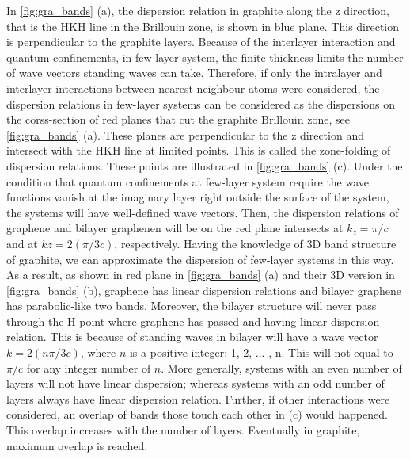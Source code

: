 In \autoref{fig:gra_bands} (a), the dispersion relation in graphite along the z direction, that is the HKH line in the Brillouin zone, is shown in blue plane. This direction is perpendicular to the graphite layers. Because of the interlayer interaction and quantum confinements, in few-layer system, the finite thickness limits the number of wave vectors standing waves can take.  Therefore, if only the intralayer and interlayer interactions between nearest neighbour atoms were considered, the dispersion relations in few-layer systems can be considered as the dispersions on the corss-section of red planes that cut the graphite Brillouin zone, see \autoref{fig:gra_bands} (a).  These planes are perpendicular to the z direction and intersect with the HKH line at limited points. This is called the zone-folding of dispersion relations\cite{saito1998physical}. These points are illustrated in \autoref{fig:gra_bands} (c). Under the condition that quantum confinements at few-layer system require the wave functions vanish at the imaginary layer right outside the surface of the system, the systems will have well-defined wave vectors. Then, the dispersion relations of graphene and bilayer graphenen will be on the red plane intersects at $k_z=\pi/c$ and at $kz=2(\pi/3c)$, respectively.  Having the knowledge of 3D band structure of graphite, we can approximate the dispersion of few-layer systems in this way. As a result, as shown in red plane in \autoref{fig:gra_bands} (a) and their 3D version in \autoref{fig:gra_bands} (b), graphene has linear dispersion relations and bilayer graphene has parabolic-like two bands. Moreover, the bilayer structure will never pass through the H point where graphene has passed and having linear dispersion relation. This is because of standing waves in bilayer will have a wave vector $k=2(n \pi/3c)$, where $n$ is a positive integer: 1, 2, ... , n. This will not equal to $\pi/c$ for any integer number of $n$. More generally, systems with an even number of layers will not have linear dispersion; whereas systems with an odd number of layers always have linear dispersion relation. Further, if other interactions were considered, an overlap of bands those touch each other in (c) would happened\cite{Partoens2006}. This overlap increases with the number of layers. Eventually in graphite, maximum overlap is reached.


